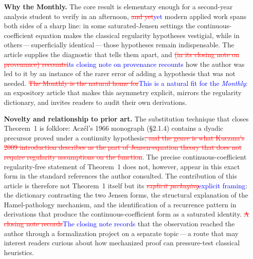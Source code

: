 \documentclass[12pt]{article}
\newcommand{\ReviewAdd}[1]{\textcolor{blue}{#1}}
\newcommand{\ReviewDel}[1]{\textcolor{red}{\sout{#1}}}
\begin{document}
\bigskip
\noindent\textbf{Why the Monthly.}
The core result is elementary enough for a second-year analysis student
to verify in an afternoon, \ReviewDel{and yet}\ReviewAdd{yet} modern applied work spans both
sides of a sharp line: in some saturated-Jensen settings the
continuous-coefficient equation makes the classical regularity
hypotheses vestigial, while in others\,---\,superficially
identical\,---\,those hypotheses remain indispensable. The article
supplies the diagnostic that tells them apart, and \ReviewDel{(in its closing
note on provenance) recounts}\ReviewAdd{its closing note on provenance recounts} how the author was led to it by an
instance of the rarer error of adding a hypothesis that was not
needed. \ReviewDel{The Monthly is the natural home for}\ReviewAdd{This is a natural fit for the \textit{Monthly}:} an expository article that
makes this asymmetry explicit, mirrors the regularity dictionary, and
invites readers to audit their own derivations.

\bigskip
\noindent\textbf{Novelty and relationship to prior art.}
The substitution technique that closes Theorem~1 is folklore:
Acz\'{e}l's 1966 monograph (\S2.1.4) contains a dyadic precursor proved
under a continuity hypothesis\ReviewDel{, and the genre is what Kuczma's 2009
introduction describes as the part of Jensen-equation theory that does
not require regularity assumptions on the function}. The precise
continuous-coefficient regularity-free statement of Theorem~1 does
not, however, appear in this exact form in the standard references the
author consulted. The contribution of this article is therefore not
Theorem~1 itself but its \ReviewDel{\emph{explicit packaging}}\ReviewAdd{explicit framing}: the dictionary
contrasting the two Jensen forms, the structural explanation of the
Hamel-pathology mechanism, and the identification of a recurrence
pattern in derivations that produce the continuous-coefficient form as
a saturated identity. \ReviewDel{A closing note records}\ReviewAdd{The closing note records} that the observation
reached the author through a formalization project on a separate
topic\,---\,a route that may interest readers curious about how
mechanized proof can pressure-test classical heuristics.
\end{document}
